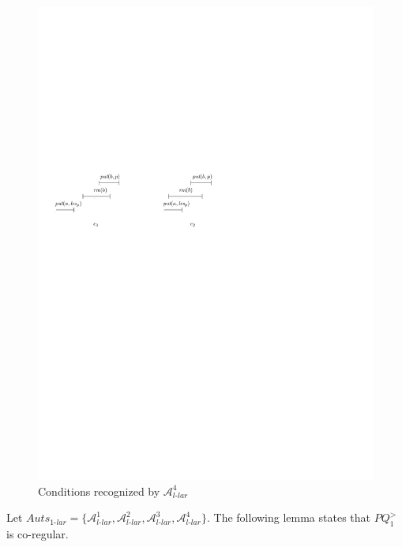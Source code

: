 \begin{figure}[htbp]
  \centering
  \includegraphics[width=0.7 \textwidth]{figures/PIC_HIS_PQ1Lar-rprp.pdf}
  \caption{Conditions recognized by $\mathcal{A}_{\textit{l-lar}}^4$}
  \label{fig:his for APQ1Lar-4}
\end{figure}

Let $\textit{Auts}_{\textit{1-lar}} = \{ \mathcal{A}_{\textit{l-lar}}^1, \mathcal{A}_{\textit{l-lar}}^2, \mathcal{A}_{\textit{l-lar}}^3, \mathcal{A}_{\textit{l-lar}}^4 \}$. The following lemma states that $\textit{PQ}_1^{>}$ is co-regular.


\PQOneLarisCoRegular*

